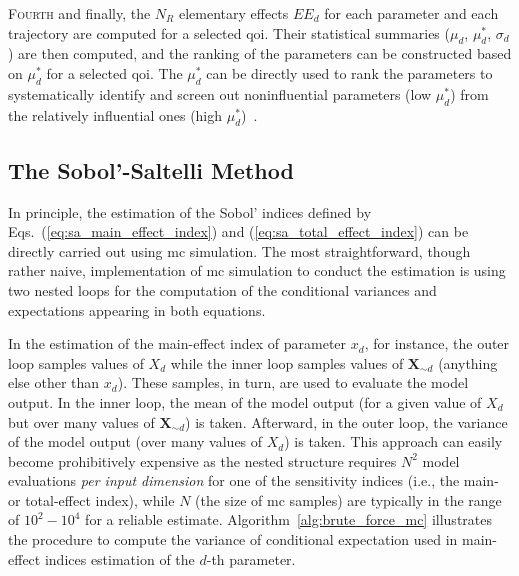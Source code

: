 \textsc{Fourth} and finally, the $N_R$ elementary effects $EE_d$ for each parameter and each trajectory are computed for a selected \gls{qoi}.
Their statistical summaries ($\mu_d$, $\mu_d^*$, $\sigma_d$) are then computed, 
and the ranking of the parameters can be constructed based on $\mu_d^*$ for a selected \gls{qoi}.
The $\mu_d^*$ can be directly used to rank the parameters to systematically identify 
and screen out noninfluential parameters (low $\mu_d^*$) from the relatively influential ones (high $\mu_d^*$)~\cite{Campolongo2007}.

\subsection{The Sobol'-Saltelli Method}\label{sub:sa_sobol_saltelli}

In principle, the estimation of the Sobol' indices defined by Eqs.~(\ref{eq:sa_main_effect_index}) and (\ref{eq:sa_total_effect_index}) can be directly carried out using \gls{mc} simulation.
The most straightforward, though rather naive, 
implementation of \gls{mc} simulation to conduct the estimation is using two nested loops for the computation of the conditional variances and expectations appearing in both equations.

In the estimation of the main-effect index of parameter $x_d$, for instance, 
the outer loop samples values of $X_d$ while the inner loop samples values of $\mathbf{X}_{\sim d}$ (anything else other than $x_d$).
These samples, in turn, are used to evaluate the model output.
In the inner loop, the mean of the model output (for a given value of $X_d$ but over many values of $\mathbf{X}_{\sim d}$) is taken. 
Afterward, in the outer loop, the variance of the model output (over many values of $X_d$) is taken.
This approach can easily become prohibitively expensive as the nested structure requires $N^2$ model evaluations \emph{per input dimension} for one of the sensitivity indices (i.e., the main- or total-effect index), 
while $N$ (the size of \gls{mc} samples) are typically in the range of $10^2 - 10^4$ for a reliable estimate. 
Algorithm~\ref{alg:brute_force_mc} illustrates the procedure to compute the variance of conditional expectation used in main-effect indices estimation of the $d$-th parameter.

